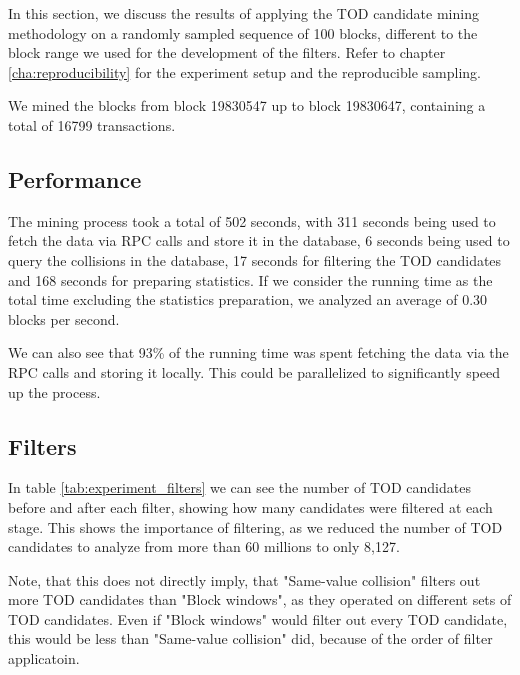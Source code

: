 \documentclass[draft,final]{vutinfth} %
\begin{document}
In this section, we discuss the results of applying the TOD candidate mining methodology on a randomly sampled sequence of 100 blocks, different to the block range we used for the development of the filters. Refer to chapter \ref{cha:reproducibility} for the experiment setup and the reproducible sampling.

We mined the blocks from block 19830547 up to block 19830647, containing a total of 16799 transactions.

\subsection{Performance}

The mining process took a total of 502 seconds, with 311 seconds being used to fetch the data via RPC calls and store it in the database, 6 seconds being used to query the collisions in the database, 17 seconds for filtering the TOD candidates and 168 seconds for preparing statistics. If we consider the running time as the total time excluding the statistics preparation, we analyzed an average of 0.30 blocks per second.

We can also see that 93\% of the running time was spent fetching the data via the RPC calls and storing it locally. This could be parallelized to significantly speed up the process.

\subsection{Filters}

In table \ref{tab:experiment_filters} we can see the number of TOD candidates before and after each filter, showing how many candidates were filtered at each stage. This shows the importance of filtering, as we reduced the number of TOD candidates to analyze from more than 60 millions to only 8,127.

Note, that this does not directly imply, that "Same-value collision" filters out more TOD candidates than "Block windows", as they operated on different sets of TOD candidates. Even if "Block windows" would filter out every TOD candidate, this would be less than "Same-value collision" did, because of the order of filter applicatoin.
\end{document}
